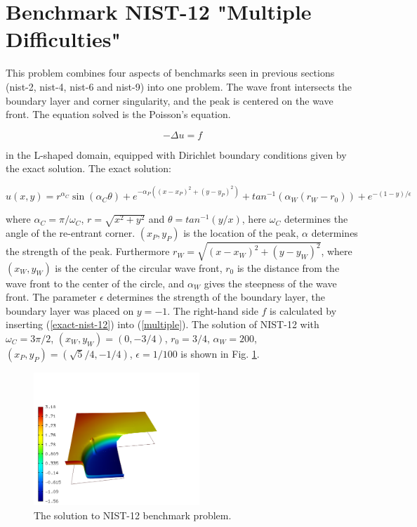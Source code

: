 \section{Benchmark NIST-12 "Multiple Difficulties"}
\label{sec:bench-12}

This problem combines four aspects of benchmarks
seen in previous sections (nist-2, nist-4, nist-6 and nist-9) into one problem.
The wave front intersects the boundary
layer and corner singularity, and the peak is centered on the wave front.
The equation solved is the Poisson's equation.

\begin{equation} \label{multiple}
-\Delta u = f
\end{equation}

in the L-shaped domain, equipped with Dirichlet boundary conditions
given by the exact solution.
The exact solution:

\begin{equation}\label{exact-nist-12}
u(x,y) =  r^{\alpha_{C} }\sin(\alpha_{C} \theta) 
+ e^{-\alpha_{P} ((x - x_{P})^{2} + (y - y_{P})^{2})} 
+ tan^{-1}(\alpha_{W} (r_{W} - r_{0}))
+ e^{-(1 - y) / \epsilon}
\end{equation}

where $\alpha_C = \pi / \omega_C$, $r = \sqrt{x^2+y^2}$
and $\theta = tan^{-1}(y/x)$, here $\omega_C$ determines
the angle of the re-entrant corner.
$(x_{P}, y_{P})$ is the location of the peak, $\alpha$
determines the strength of the peak. Furthermore
$r_{W} = \sqrt{(x - x_{W})^{2} + (y - y_{W})^{2}}$,
where $(x_{W}, y_{W})$ is the center of the circular wave front,
$r_{0}$ is the distance from the wave front to the
center of the circle, and $\alpha_W$ gives
the steepness of the wave front. The parameter $\epsilon$ determines the
strength of the boundary layer, the boundary layer was placed on $y = -1$.
The right-hand side $f$ is calculated by inserting (\ref{exact-nist-12})
into (\ref{multiple}).
The solution of NIST-12 with $\omega_C = 3 \pi /2$,
$(x_{W}, y_{W}) = (0, -3/4)$, $r_{0} = 3/4$, $\alpha_{W} = 200$,
$(x_{P}, y_{P}) = (\sqrt{5} / 4, -1/4)$,
$\epsilon = 1/100$ is shown in Fig. \ref{fig:sln-nist12}.

\begin{figure}[!ht]
\centering
\includegraphics[height=5cm]{nist/nist-12/solution.png}
\caption{The solution to NIST-12 benchmark problem.}
\label{fig:sln-nist12}
\end{figure}

